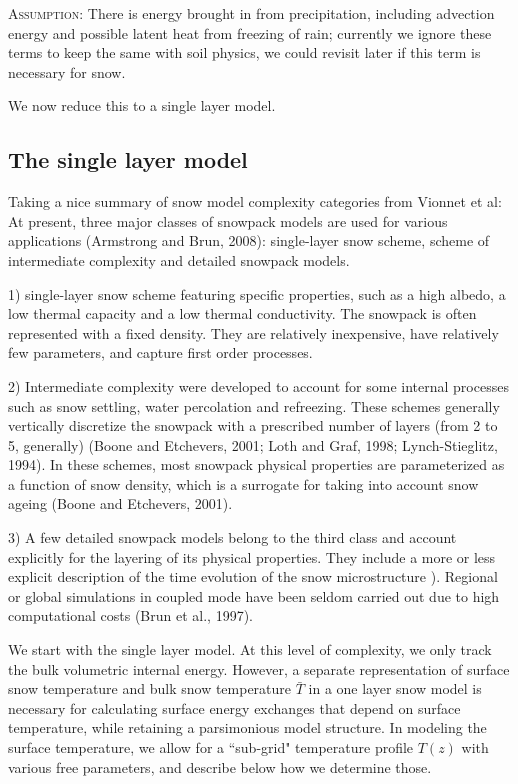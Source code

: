 \documentclass[twoside,10pt]{report}
\begin{document}
\begin{framed}
\textsc{Assumption:} There is energy brought in from precipitation, including advection energy and possible latent heat from freezing of rain; currently we ignore these terms to keep the same with soil physics, we could revisit later if this term is necessary for snow.
\end{framed}


We now reduce this to a single layer model.
\subsection{The single layer model}
Taking a nice summary of snow model complexity categories from Vionnet et al:
At present, three major classes of snowpack models are used for various applications (Armstrong and Brun, 2008): single-layer snow scheme, scheme of intermediate complexity and detailed snowpack models.

1) single-layer snow scheme featuring specific properties, such as a high albedo, a low thermal capacity and a low thermal conductivity. The snowpack is often represented with a fixed density. They are relatively inexpensive, have relatively few parameters, and capture first order processes. 

2) Intermediate complexity were developed to account for some internal processes such as snow settling, water percolation and refreezing. These schemes generally vertically discretize the snowpack with a prescribed number of layers (from 2 to 5, generally) (Boone and Etchevers, 2001; Loth and Graf, 1998; Lynch-Stieglitz, 1994). In these schemes, most snowpack physical properties are parameterized as a function of snow density, which is a surrogate for taking into account snow ageing (Boone and Etchevers, 2001).

3) A few detailed snowpack models belong to the third class and account explicitly for the layering of its physical properties. They include a more or less explicit description of the time evolution of the snow microstructure ). Regional or global simulations in coupled mode have been seldom carried out due to high computational costs (Brun et al., 1997).

We start with the single layer model. At this level of complexity, we only track the bulk volumetric internal energy. However, a separate representation of surface snow temperature and bulk snow temperature $\bar{T}$ in a one layer snow model is necessary for calculating surface energy exchanges that depend on surface temperature, while retaining a parsimonious model structure. In modeling the surface temperature, we allow for a ``sub-grid" temperature profile $T(z)$ with various free parameters, and describe below how we determine those.
\end{document}
